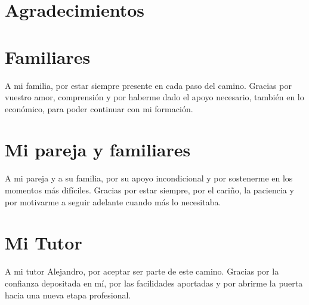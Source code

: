 \documentclass[a4paper, 11pt]{article}
\begin{document}

\section*{Agradecimientos}
\section*{Familiares}

\thispagestyle{empty}

\vfill
\begin{flushright}
\begin{minipage}{0.5\textwidth}
A mi familia, por estar siempre presente en cada paso del camino. Gracias por vuestro amor, comprensión y por haberme dado el apoyo necesario, también en lo económico, para poder continuar con mi formación.
\end{minipage}
\end{flushright}
\clearpage

\section*{Mi pareja y familiares}
\thispagestyle{empty}

\vfill
\begin{flushright}
\begin{minipage}{0.5\textwidth}
A mi pareja y a su familia, por su apoyo incondicional y por sostenerme en los momentos más difíciles. Gracias por estar siempre, por el cariño, la paciencia y por motivarme a seguir adelante cuando más lo necesitaba.
\end{minipage}
\end{flushright}
\clearpage

\section*{Mi Tutor}
\thispagestyle{empty}

\vfill
\begin{flushright}
\begin{minipage}{0.5\textwidth}
A mi tutor Alejandro, por aceptar ser parte de este camino. Gracias por la confianza depositada en mí, por las facilidades aportadas y por abrirme la puerta hacia una nueva etapa profesional.
\end{minipage}
\end{flushright}
\clearpage
\end{document}
